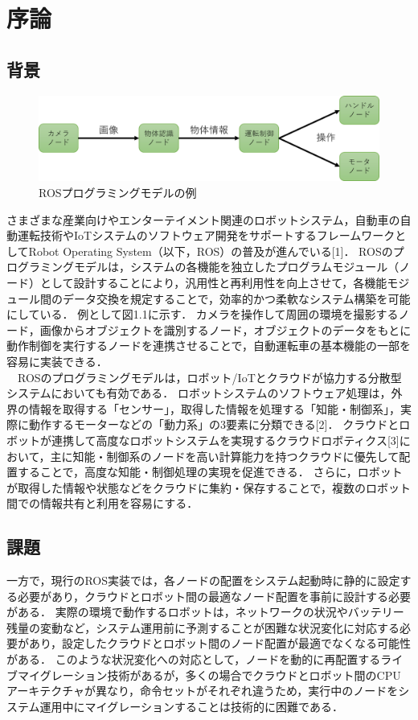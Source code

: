 \chapter{序論}
\section{背景}
\begin{figure}[ht]
    \centering
    \includegraphics[width=15cm]{images/fig1_rosprograming_configuration.png}
    \caption{ROSプログラミングモデルの例}
    \label{fig:ros_programing_model}
\end{figure}
さまざまな産業向けやエンターテイメント関連のロボットシステム，自動車の自動運転技術やIoTシステムのソフトウェア開発をサポートするフレームワークとしてRobot Operating System（以下，ROS）の普及が進んでいる[1]．
ROSのプログラミングモデルは，システムの各機能を独立したプログラムモジュール（ノード）として設計することにより，汎用性と再利用性を向上させて，各機能モジュール間のデータ交換を規定することで，効率的かつ柔軟なシステム構築を可能にしている．
例として図1.1に示す．
カメラを操作して周囲の環境を撮影するノード，画像からオブジェクトを識別するノード，オブジェクトのデータをもとに動作制御を実行するノードを連携させることで，自動運転車の基本機能の一部を容易に実装できる．
\\　ROSのプログラミングモデルは，ロボット/IoTとクラウドが協力する分散型システムにおいても有効である．
ロボットシステムのソフトウェア処理は，外界の情報を取得する「センサー」，取得した情報を処理する「知能・制御系」，実際に動作するモーターなどの「動力系」の3要素に分類できる[2]．
クラウドとロボットが連携して高度なロボットシステムを実現するクラウドロボティクス[3]において，主に知能・制御系のノードを高い計算能力を持つクラウドに優先して配置することで，高度な知能・制御処理の実現を促進できる．
さらに，ロボットが取得した情報や状態などをクラウドに集約・保存することで，複数のロボット間での情報共有と利用を容易にする．
\section{課題}
一方で，現行のROS実装では，各ノードの配置をシステム起動時に静的に設定する必要があり，クラウドとロボット間の最適なノード配置を事前に設計する必要がある．
実際の環境で動作するロボットは，ネットワークの状況やバッテリー残量の変動など，システム運用前に予測することが困難な状況変化に対応する必要があり，設定したクラウドとロボット間のノード配置が最適でなくなる可能性がある．
このような状況変化への対応として，ノードを動的に再配置するライブマイグレーション技術があるが，多くの場合でクラウドとロボット間のCPUアーキテクチャが異なり，命令セットがそれぞれ違うため，実行中のノードをシステム運用中にマイグレーションすることは技術的に困難である．
